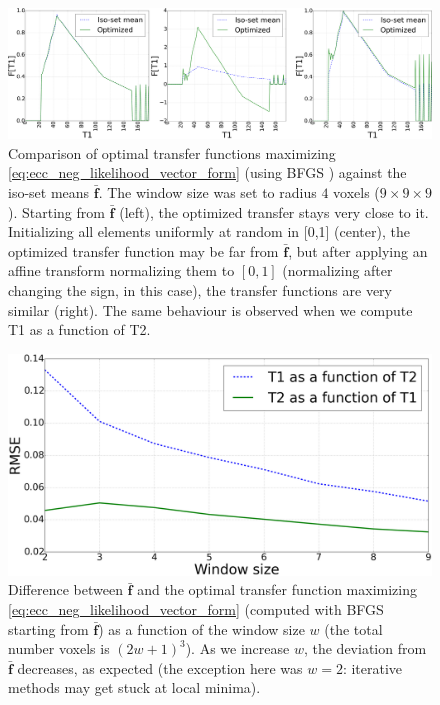 \begin{figure}[t]
\centering
    \includegraphics[width=1.0\linewidth]{./images/comparison_optimal_transfers_t1lab_3.png}
    \caption{{\small Comparison of optimal transfer functions maximizing \eqref{eq:ecc_neg_likelihood_vector_form} (using BFGS \cite{GVK502988711}) against the iso-set means $\mathbf{\bar{f}}$. The window size was set to radius $4$ voxels ($9\times 9\times 9$). Starting from $\mathbf{\bar{f}}$ (left), the optimized transfer stays very close to it. Initializing all elements uniformly at random in [0,1] (center), the optimized transfer function may be far from $\mathbf{\bar{f}}$, but after applying an affine transform normalizing them to $[0,1]$ (normalizing after changing the sign, in this case), the transfer functions are very similar (right). The same behaviour is observed when we compute T1 as a function of T2.}}
\label{fig:comparison_optimal_transfers}\figcloser
\end{figure}
\begin{figure}[t]
\centering
    \includegraphics[width=1.0\linewidth]{./images/LLR_transfer_rmse.png}
    \caption{{\small Difference between $\mathbf{\bar{f}}$ and the optimal transfer function maximizing \eqref{eq:ecc_neg_likelihood_vector_form} (computed with BFGS starting from $\mathbf{\bar{f}}$) as a function of the window size $w$ (the total number voxels is $(2w+1)^{3}$). As we increase $w$, the deviation from $\mathbf{\bar{f}}$ decreases, as expected (the exception here was $w=2$: iterative methods may get stuck at local minima).}}
\label{fig:LLR_transfer_rmse}\figcloser
\end{figure}
